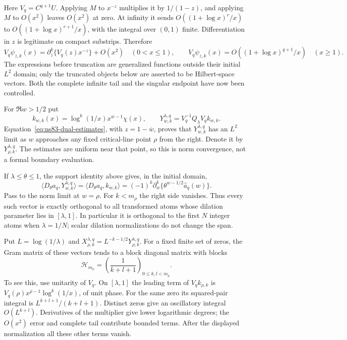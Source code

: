 Here $V_q=C^{q+1}U$. Applying $M$ to $x^{-z}$ multiplies it by
$1/(1-z)$, and applying $M$ to $O(x^2)$ leaves $O(x^2)$ at zero.
At infinity it sends $O((1+\log x)^r/x)$ to
$O((1+\log x)^{r+1}/x)$, with the integral over $(0,1)$ finite.
Differentiation in $z$ is legitimate on compact substrips. Therefore
\begin{equation}
 V_q\psi_{z,k}(x)=\partial_z^k\{V_q(z)x^{-z}\}+O(x^2)
                      \quad(0<x\leq1),\qquad
 V_q\psi_{z,k}(x)=O((1+\log x)^{q+1}/x)\quad(x\geq1).
 \label{eq:ns83-dual-estimates}
\end{equation}
The expressions before truncation are generalized functions outside their
initial $L^2$ domain; only the truncated objects below are asserted to be
Hilbert-space vectors. Both the complete infinite tail and the singular
endpoint have now been controlled.

For $\Re w>1/2$ put
\[
 k_{w,k}(x)=\log^k(1/x)x^{\overline w-1}\chi(x),\qquad
 Y^{\lambda,q}_{w,k}=V_q^{-1}Q_\lambda V_q k_{w,k}.
\]
Equation~\eqref{eq:ns83-dual-estimates}, with $z=1-\overline w$,
proves that $Y^{\lambda,q}_{w,k}$ has an $L^2$ limit as $w$ approaches
any fixed critical-line point $\rho$ from the right. Denote it by
$Y^{\lambda,q}_{\rho,k}$. The estimates are uniform near that point,
so this is norm convergence, not a formal boundary evaluation.

If $\lambda\leq\theta\leq1$, the support identity above gives, in
the initial domain,
\[
 \langle D_\theta a_q,Y^{\lambda,q}_{w,k}\rangle
 =\langle D_\theta a_q,k_{w,k}\rangle
 =(-1)^k\partial_w^k\{\theta^{w-1/2}\widehat a_q(w)\}.
\]
Pass to the norm limit at $w=\rho$. For $k<m_\rho$ the right side
vanishes. Thus every such vector is exactly orthogonal to all
transformed atoms whose dilation parameter lies in $[\lambda,1]$.
In particular it is orthogonal to the first $N$ integer atoms when
$\lambda=1/N$; scalar dilation normalizations do not change the span.

Put $L=\log(1/\lambda)$ and
$X^{\lambda,q}_{\rho,k}=L^{-k-1/2}Y^{\lambda,q}_{\rho,k}$.
For a fixed finite set of zeros, the Gram matrix of these vectors tends
to a block diagonal matrix with blocks
\begin{equation}
 \mathcal H_{m_\rho}=\left(\frac1{k+l+1}\right)_{0\leq k,l<m_\rho}.
 \label{eq:ns83-hilbert-blocks}
\end{equation}
To see this, use unitarity of $V_q$. On $[\lambda,1]$ the leading
term of $V_q k_{\rho,k}$ is
$V_q(\rho)x^{\overline\rho-1}\log^k(1/x)$, of unit phase.
For the same zero its squared-pair integral is
$L^{k+l+1}/(k+l+1)$. Distinct zeros give an oscillatory integral
$O(L^{k+l})$. Derivatives of the multiplier give lower logarithmic
degrees; the $O(x^2)$ error and complete tail contribute bounded terms.
After the displayed normalization all these other terms vanish.

